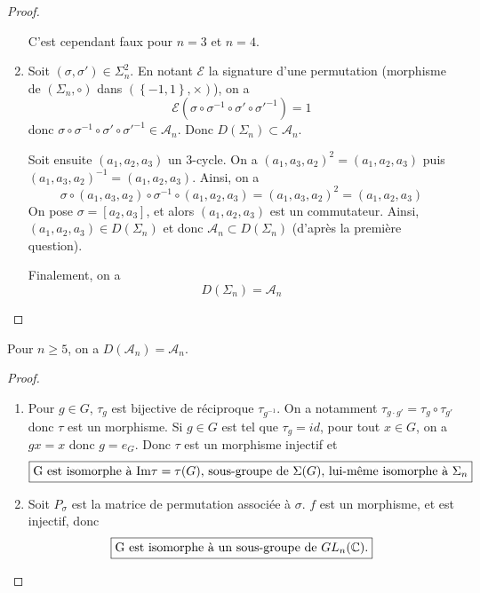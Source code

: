 \begin{proof}
\begin{enumerate}
		C'est cependant faux pour $n=3$ et $n=4$.

		\item Soit $(\sigma,\sigma')\in\Sigma_{n}^{2}$. En notant $\mathcal{E}$ la signature d'une permutation (morphisme de $(\Sigma_{n},\circ)$ dans $(\left\{-1,1\right\},\times)$), on a
		\begin{equation}
			\mathcal{E}(\sigma\circ\sigma^{-1}\circ\sigma'\circ\sigma'^{-1})=1
		\end{equation}
		donc $\sigma\circ\sigma^{-1}\circ\sigma'\circ\sigma'^{-1}\in\mathcal{A}_{n}$. Donc $D(\Sigma_{n})\subset\mathcal{A}_{n}$.

		Soit ensuite $(a_{1},a_{2},a_{3})$ un 3-cycle. On a $(a_{1},a_{3},a_{2})^{2}=(a_{1},a_{2},a_{3})$ puis\\$(a_{1},a_{3},a_{2})^{-1}=(a_{1},a_{2},a_{3})$. Ainsi, on a 
		\begin{equation}
			\sigma\circ(a_{1},a_{3},a_{2})\circ\sigma^{-1}\circ(a_{1},a_{2},a_{3})=(a_{1},a_{3},a_{2})^{2}=(a_{1},a_{2},a_{3})
		\end{equation}
		On pose $\sigma=[a_{2},a_{3}]$, et alors $(a_{1},a_{2},a_{3})$ est un commutateur. Ainsi, $(a_{1},a_{2},a_{3})\in D(\Sigma_{n})$ et donc $\mathcal{A}_{n}\subset D(\Sigma_{n})$ (d'après la première question).

		Finalement, on a 
		\begin{equation}
			\boxed{D(\Sigma_{n})=\mathcal{A}_{n}}
		\end{equation}
	\end{enumerate}
\end{proof}

\begin{remark}
	Pour $n\geqslant5$, on a $D(\mathcal{A}_{n})=\mathcal{A}_{n}$.
\end{remark}

\begin{proof}
	\phantom{}
	\begin{enumerate}
		\item Pour $g\in G$, $\tau_{g}$ est bijective de réciproque $\tau_{g^{-1}}$. On a notamment $\tau_{g\cdot g'}=\tau_{g}\circ\tau_{g'}$ donc $\tau$ est un morphisme. Si $g\in G$ est tel que $\tau_{g}=id$, pour tout $x\in G$, on a $gx=x$ donc $g=e_{G}$. Donc $\tau$ est un morphisme injectif et 
		\begin{equation}
			\boxed{\text{G est isomorphe à }\mathrm{Im}\tau=\tau(G)\text{, sous-groupe de }\Sigma(G)\text{, lui-même isomorphe à }\Sigma_{n}}
		\end{equation}
		
		\item Soit 
		$P_{\sigma}$ est la matrice de permutation associée à $\sigma$. $f$ est un morphisme, et est injectif, donc 
		\begin{equation}
			\boxed{\text{G est isomorphe à un sous-groupe de }GL_{n}(\mathbb{C}).}
		\end{equation}
	\end{enumerate}
\end{proof}


